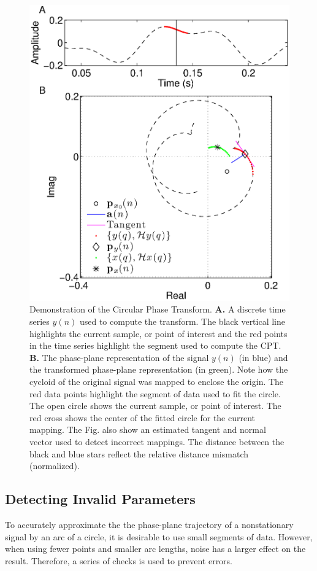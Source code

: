 \documentclass[journal,11pt,a4paper,onecolumn,draftcls]{IEEEtran}
\begin{document}
\begin{figure}
    \centering
    \includegraphics[scale=0.42]{./Figures/MappingDemonstration.eps}
    \caption[MappingDemo]{Demonstration of the Circular Phase Transform. \textbf{A.} A discrete time series $y(n)$ used to compute the transform. The black vertical line highlights the current sample, or point of interest and the red points in the time series highlight the segment used to compute the CPT. \textbf{B.} The phase-plane representation of the signal $y(n)$ (in blue) and the transformed phase-plane representation (in green). Note how the cycloid of the original signal was mapped to enclose the origin. The red data points highlight the segment of data used to fit the circle. The open circle shows the current sample, or point of interest. The red cross shows the center of the fitted circle for the current mapping. The Fig. also show an estimated tangent and normal vector used to detect incorrect mappings. The distance between the black and blue stars reflect the relative distance mismatch (normalized).}
    \label{fig:MappingDemo}
\end{figure}

\subsection{Detecting Invalid Parameters}\label{sect:DetectingInvalidParameters}
To accurately approximate the the phase-plane trajectory of a nonstationary signal by an arc of a circle, it is desirable to use small segments of data. However, when using fewer points and smaller arc lengths, noise has a larger effect on the result. Therefore, a series of checks is used to prevent errors. 
\end{document}

